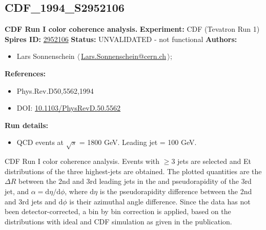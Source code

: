 \subsection[CDF\_1994\_S2952106]{CDF\_1994\_S2952106\,\cite{Abe:1994nj}}
\textbf{CDF Run I color coherence analysis.}\newline
\textbf{Experiment:} CDF (Tevatron Run 1) \newline
\textbf{Spires ID:} \href{http://www.slac.stanford.edu/spires/find/hep/www?rawcmd=key+2952106}{2952106}\newline
\textbf{Status:} UNVALIDATED - not functional\newline
\textbf{Authors:}
\begin{itemize}
  \item Lars Sonnenschein $\langle\,$\href{mailto:Lars.Sonnenschein@cern.ch}{Lars.Sonnenschein@cern.ch}$\,\rangle$;
\end{itemize}
\textbf{References:}
\begin{itemize}
  \item Phys.Rev.D50,5562,1994
  \item DOI: \href{http://dx.doi.org/10.1103/PhysRevD.50.5562}{10.1103/PhysRevD.50.5562}
\end{itemize}
\textbf{Run details:}
\begin{itemize}

  \item QCD events at \ensuremath{\sqrt{s}} = 1800 GeV. Leading jet \pTmin = 100 GeV.\end{itemize}

\noindent CDF Run I color coherence analysis. Events with $\ge 3$ jets are selected and Et distributions of the three highest-\pT jets are obtained. The plotted quantities are the $\Delta{R}$ between the 2nd and 3rd leading jets in the \pT and pseudorapidity of the 3rd jet, and $\alpha = \mathrm{d}{\eta}/\mathrm{d}{\phi}$, where $\mathrm{d}{\eta}$ is the pseudorapidity difference between the 2nd and 3rd jets and $\mathrm{d}{\phi}$ is their azimuthal angle difference.  Since the data has not been detector-corrected, a bin by bin correction is applied, based on the distributions with ideal and CDF simulation as given in the publication.

\clearpage


\clearpage

